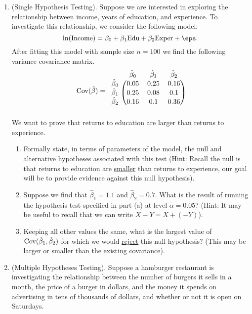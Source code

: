 \documentclass[10pt]{article}
\begin{document}
\begin{enumerate}
	\item (Single Hypothesis Testing). Suppose we are interested in exploring the relationship between income, years of education, and experience. To investigate this relationship, we consider the following model:
	 \[
		 \ln(\text{Income}) = \beta_0 + \beta_1\text{Edu} + \beta_2\text{Exper} + \eps
	.\] 
	After fitting this model with sample size \(n=100\) we find the following variance covariance matrix.
	\begin{equation*}
	\Cov(\hat\beta) = 
	  \begin{blockarray}{lccc}
		  & {\hat\beta_0} &{\hat\beta_1} &{\hat\beta_2}\\
		  \begin{block}{l(ccc)}
		  {\hat\beta_0} & 0.05 & 0.25 & 0.16 \\
		  {\hat\beta_1} & 0.25 & 0.08 & 0.1 \\
		  {\hat\beta_2} & 0.16 & 0.1 & 0.36 \\
	  	  \end{block}
	  \end{blockarray}
	\end{equation*}
	We want to prove that returns to education are larger than returns to experience.
	\begin{enumerate}
		\item Formally state, in terms of parameters of the model, the null and alternative hypotheses associated with this test (Hint: Recall the null is that returns to education are \underline{smaller} than returns to experience, our goal will be to provide evidence against this null hypothesis).
		\item Suppose we find that \(\hat\beta_1 = 1.1\) and \(\hat\beta_2 = 0.7\). What is the result of running the hypothesis test specified in part (a) at level \(\alpha = 0.05\)? (Hint: It may be useful to recall that we can write  \(X- Y = X + (-Y)\)).
		\item Keeping all other values the same, what is the largest value of \(\operatorname{Cov}(\hat\beta_1,\hat\beta_2)\) for which we would \underline{reject} this null hypothesis? (This may be larger or smaller than the existing covariance).
	\end{enumerate}
	\item (Multiple Hypotheses Testing). Suppose a hamburger restaurant is investigating the relationship between the number of burgers it sells in a month, the price of a burger in dollars, and the money it spends on advertising in tens of thousands of dollars, and whether or not it is open on Saturdays.


\end{enumerate}
\end{document}
